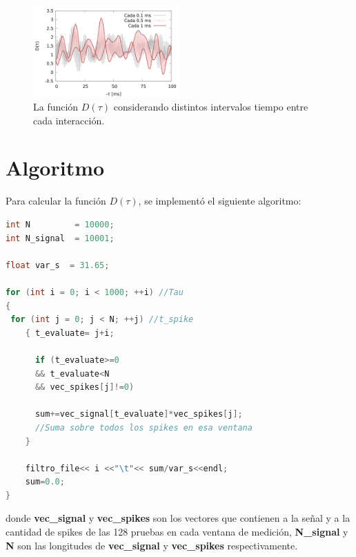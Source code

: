 \begin{figure}[H]
	\centering
	\includegraphics[width=0.5\textwidth]{../Graficos/D_tau.png}
	\caption{La función $D(\tau)$ considerando distintos intervalos tiempo entre cada interacción.}
	\label{d_tau}
\end{figure}



\appendix
\section{Algoritmo} \label{algor}

Para calcular la función $D(\tau)$, se implementó  el siguiente algoritmo:

\begin{lstlisting}[language=C++]
int N  		  = 10000;
int N_signal  = 10001;

float var_s  = 31.65;

for (int i = 0; i < 1000; ++i) //Tau
{
 for (int j = 0; j < N; ++j) //t_spike
 	{ t_evaluate= j+i;
	  
	  if (t_evaluate>=0 
	  && t_evaluate<N
	  && vec_spikes[j]!=0) 

	  sum+=vec_signal[t_evaluate]*vec_spikes[j];
	  //Suma sobre todos los spikes en esa ventana
	}
	
	filtro_file<< i <<"\t"<< sum/var_s<<endl;
	sum=0.0;
}
\end{lstlisting}
donde \textbf{vec\_signal} y \textbf{vec\_spikes} son los vectores que contienen a la señal y a la cantidad de spikes de las 128 pruebas en cada ventana de medición, \textbf{N\_signal} y \textbf{N} son las longitudes de \textbf{vec\_signal} y \textbf{vec\_spikes} respectivamente.




